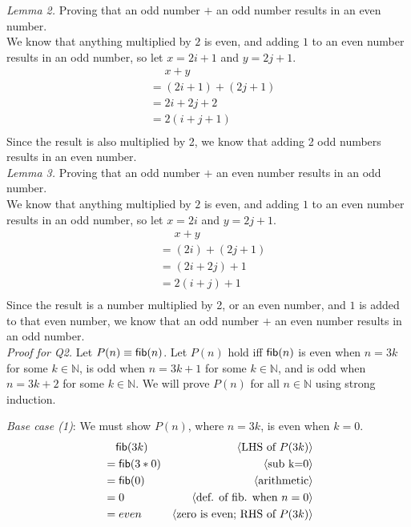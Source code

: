 \documentclass[11pt,fleqn]{article}
\newcommand{\mname}[1]{\mbox{\sf #1}}
\newcommand{\pnote}[1]{{\langle \text{#1} \rangle}}
\begin{document}
\begin{enumerate}
  \emph{Lemma 2.} Proving that an odd number $+$ an odd number results in an even number.\\
  We know that anything multiplied by $2$ is even, and adding $1$ to an even number results in an odd number, so let $x=2i+1$ and $y=2j+1$.\\
  \begin{align*}
    &\phantom{{}=} x+y\\
    &= (2i+1)+(2j+1)\\
    &= 2i+2j+2\\
    &= 2(i+j+1)\\
  \end{align*}
  Since the result is also multiplied by 2, we know that adding 2 odd numbers results in an even number.\\

  \emph{Lemma 3.} Proving that an odd number $+$ an even number results in an odd number.\\
  We know that anything multiplied by $2$ is even, and adding $1$ to an even number results in an odd number, so let $x=2i$ and $y=2j+1$.\\
  \begin{align*}
    &\phantom{{}=} x+y\\
    &= (2i)+(2j+1)\\
    &= (2i+2j)+1\\
    &= 2(i+j)+1\\
  \end{align*}
  Since the result is a number multiplied by 2, or an even number, and $1$ is added to that even number, we know that an odd number $+$ an even number results in an odd number.\\

  \emph{Proof for Q2.} Let $P(n) \equiv \mname{fib}(n)$. Let $P(n)$ hold iff $\mname{fib}(n)$ is even when $n = 3k$ for some $k \in \mathbb{N}$, is odd when $n = 3k + 1$ for some $k \in \mathbb{N}$, and is odd when $n = 3k + 2$ for some $k \in \mathbb{N}$. We will prove $P(n)$ for all $n \in \mathbb{N}$ using strong induction.
  
    \medskip

  \emph{Base case (1)}: We must show $P(n)$, where $n=3k$, is even when $k=0$.
  \begin{align*}
    &\phantom{{}=} \mname{fib}(3k) & \pnote{LHS of $P(3k)$}\\
    &= \mname{fib}(3*0)  & \pnote{sub k=0}\\
    &= \mname{fib}(0) & \pnote{arithmetic}\\
    &= 0 & \pnote{def. of fib. when $n=0$}\\
    &= even    & \pnote{zero is even; RHS of $P(3k)$}\\
  \end{align*}


\end{enumerate}
\end{document}
